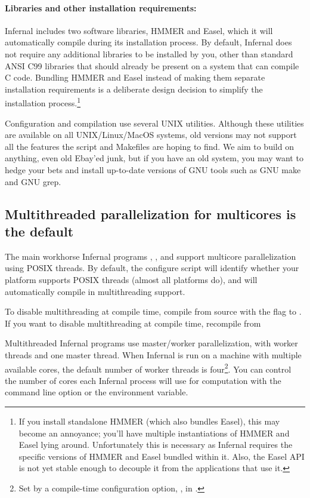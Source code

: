 \paragraph{Libraries and other installation requirements:} Infernal includes
two software libraries, HMMER and Easel, which it will automatically
compile during its installation process.  By default, Infernal does
not require any additional libraries to be installed by you, other
than standard ANSI C99 libraries that should already be present on a
system that can compile C code. Bundling HMMER and Easel instead of
making them separate installation requirements is a deliberate design
decision to simplify the installation process.\footnote{If you install
standalone HMMER (which also bundles Easel), this may become an
annoyance; you'll have multiple instantiations of HMMER and Easel
lying around. Unfortunately this is necessary as Infernal requires the
specific versions of HMMER and Easel bundled within it. Also, the
Easel API is not yet stable enough to decouple it from the
applications that use it.}

Configuration and compilation use several UNIX utilities. Although
these utilities are available on all UNIX/Linux/MacOS systems, old
versions may not support all the features the 
script and Makefiles are hoping to find. We aim to build on anything,
even old Ebay'ed junk, but if you have an old system, you may want to
hedge your bets and install up-to-date versions of GNU tools such as
GNU make and GNU grep.

\subsection{Multithreaded parallelization for multicores is the default}

The main workhorse Infernal programs ,
,  and  support
multicore parallelization using POSIX threads. By default, the
configure script will identify whether your platform supports POSIX
threads (almost all platforms do), and will automatically compile in
multithreading support.

To disable multithreading at compile time, compile from source with
the  flag to .
If you want to disable multithreading at compile time, recompile from

Multithreaded Infernal programs use master/worker parallelization, with
 worker threads and one master thread. When Infernal is run on
a machine with multiple available cores, the default number of worker
threads is four\footnote{Set by a compile-time configuration option,
  , in .}. You can control the
number of cores each Infernal process will use for computation with the
 command line option or the 
environment variable.

